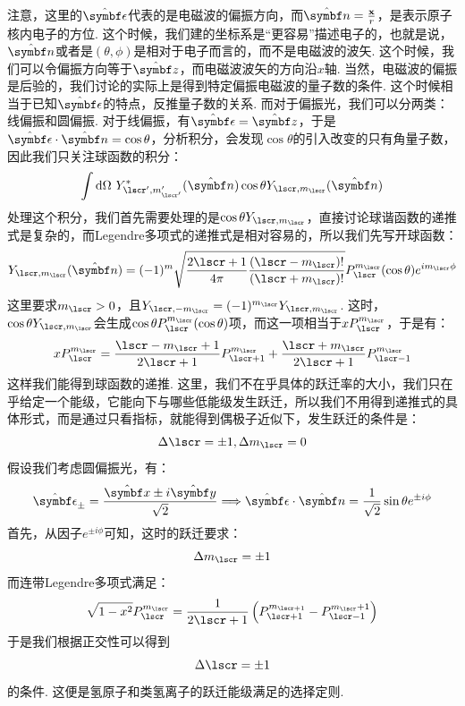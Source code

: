 注意，这里的\(\uv{\epsilon}\)代表的是电磁波的偏振方向，而\(\uv{n}=\frac{\vr}{r}\)，是表示原子核内电子的方位. 这个时候，我们建的坐标系是“更容易”描述电子的，也就是说，\(\uv{n}\)或者是\((\theta,\phi)\)是相对于电子而言的，而不是电磁波的波矢. 这个时候，我们可以令偏振方向等于\(\uv{z}\)，而电磁波波矢的方向沿\(x\)轴. 当然，电磁波的偏振是后验的，我们讨论的实际上是得到特定偏振电磁波的量子数的条件. 这个时候相当于已知\(\uv{\epsilon}\)的特点，反推量子数的关系. 而对于偏振光，我们可以分两类：线偏振和圆偏振. 对于线偏振，有\(\uv{\epsilon}=\uv{z}\)，于是\(\uv{\epsilon}\cdot\uv{n}=\cos\theta\)，分析积分，会发现\(\cos\theta\)的引入改变的只有角量子数，因此我们只关注球函数的积分：
\begin{align*}
\int\dd\Omega\ Y^{*}_{\lscr',m_{\lscr'}'}(\uv{n})\cos\theta Y_{\lscr,m_{\lscr}}(\uv{n}) \\
\end{align*}
处理这个积分，我们首先需要处理的是\(\cos\theta Y_{\lscr,m_{\lscr}}\)，直接讨论球谐函数的递推式是复杂的，而Legendre多项式的递推式是相对容易的，所以我们先写开球函数：
\[
Y_{\lscr,m_{\lscr}}(\uv{n}) = (-1)^{m}\sqrt{\frac{2\lscr+1}{4\pi}\frac{\br{\lscr-m_{\lscr}}!}{\br{\lscr+m_{\lscr}}!}}P_{\lscr}^{m_{\lscr}}(\cos\theta)e^{im_{\lscr}\phi}
\]
这里要求\(m_{\lscr}>0\)，且\(Y_{\lscr,-m_{\lscr}} = (-1)^{m_{\lscr}}Y_{\lscr,m_{\lscr}}\). 这时，\(\cos\theta Y_{\lscr,m_{\lscr}}\)会生成\(\cos\theta P_{\lscr}^{m_{\lscr}}(\cos\theta)\)项，而这一项相当于\(xP_{\lscr}^{m_{\lscr}}\)，于是有：
\[
xP_{\lscr}^{m_{\lscr}} = \frac{\lscr - m_{\lscr} + 1}{2\lscr+1}P_{\lscr+1}^{m_{\lscr}} + \frac{\lscr+m_{\lscr}}{2\lscr+1}P_{\lscr-1}^{m_{\lscr}}
\]
这样我们能得到球函数的递推. 这里，我们不在乎具体的跃迁率的大小，我们只在乎给定一个能级，它能向下与哪些低能级发生跃迁，所以我们不用得到递推式的具体形式，而是通过只看指标，就能得到偶极子近似下，发生跃迁的条件是：
\[
\Delta\lscr = \pm 1, \Delta m_{\lscr} = 0
\]
假设我们考虑圆偏振光，有：
\[
\uv{\epsilon}_{\pm} = \frac{\uv{x}\pm i\uv{y}}{\sqrt{2}} \Longrightarrow \uv{\epsilon}\cdot\uv{n} = \frac{1}{\sqrt{2}}\sin\theta e^{\pm i\phi}
\]
首先，从因子\(e^{\pm i{\phi}}\)可知，这时的跃迁要求：
\[
\Delta m_{\lscr} = \pm 1
\]
而连带Legendre多项式满足：
\[
\sqrt{1-x^{2}}P_{\lscr}^{m_{\lscr}} = \frac{1}{2\lscr+1}\br{P_{\lscr+1}^{m_{\lscr+1}} - P_{\lscr-1}^{m_{\lscr}+1}}
\]
于是我们根据正交性可以得到
\[
\Delta\lscr = \pm 1
\]
的条件. 这便是氢原子和类氢离子的跃迁能级满足的选择定则. 
